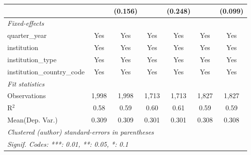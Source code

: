 \begin{tabular}{lcccccc}
                                      &             & (0.156)       &             & (0.248)       &             & (0.099)\\   
   \midrule
   \emph{Fixed-effects}\\
   quarter\_year                      & Yes         & Yes           & Yes         & Yes           & Yes         & Yes\\  
   institution                        & Yes         & Yes           & Yes         & Yes           & Yes         & Yes\\  
   institution\_type                  & Yes         & Yes           & Yes         & Yes           & Yes         & Yes\\  
   institution\_country\_code         & Yes         & Yes           & Yes         & Yes           & Yes         & Yes\\  
   \midrule
   \emph{Fit statistics}\\
   Observations                       & 1,998       & 1,998         & 1,713       & 1,713         & 1,827       & 1,827\\  
   R$^2$                              & 0.58        & 0.59          & 0.60        & 0.61          & 0.59        & 0.59\\  
Mean(Dep. Var.) & 0.309 & 0.309 & 0.301 & 0.301 & 0.308 & 0.308 \\
   \midrule \midrule
   \multicolumn{7}{l}{\emph{Clustered (author) standard-errors in parentheses}}\\
   \multicolumn{7}{l}{\emph{Signif. Codes: ***: 0.01, **: 0.05, *: 0.1}}\\
\end{tabular}
\par\endgroup
